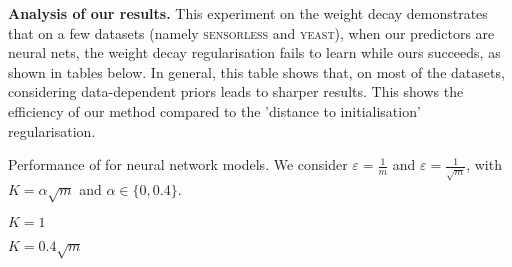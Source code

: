 \begin{noaddcontents}
    \textbf{Analysis of our results.}
    This experiment on the weight decay demonstrates that on a few datasets (namely \textsc{sensorless} and \textsc{yeast}), when our predictors are neural nets, the weight decay regularisation fails to learn while ours succeeds, as shown in tables below.
    In general, this table shows that, on most of the datasets, considering data-dependent priors leads to sharper results.
    This shows the efficiency of our method compared to the 'distance to initialisation' regularisation.
    
    
    \begin{table}[ht]
        \caption{Performance of  for neural network models.
    We consider $\varepsilon=\frac{1}{m}$ and $\varepsilon=\frac{1}{\sqrt{m}}$, with $K=\alpha\sqrt{m}$ and $\alpha\in\{0,0.4\}$.}
        \begin{adjustbox}{width=0.45\columnwidth}
        \begin{subtable}{0.5\textwidth}
            \centering
            \caption{$K=1$}
            
           \label{tab:sup_nn_batch_0}
        \end{subtable}\end{adjustbox}%
        \hspace{1.0cm}\begin{adjustbox}{width=0.45\columnwidth}
        \begin{subtable}{0.5\textwidth}
            \centering
            \caption{$K=0.4\sqrt{m}$}
            
            \label{tab:sup_nn_batch_4}
        \end{subtable}\end{adjustbox}
        \label{tab:expe-3}
    \end{table}
    
    
    


\end{noaddcontents}
